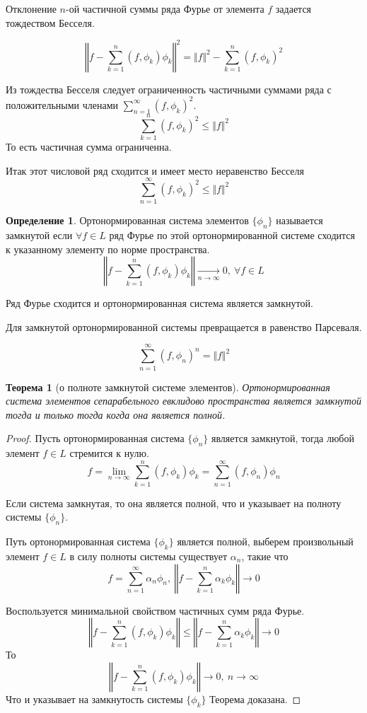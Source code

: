 \documentclass[14pt,a4paper]{extarticle}
\newtheorem{theorem}{Теорема}[section]
\theoremstyle{definition}
\newtheorem{definition}{Определение}[section]
\theoremstyle{remark}
\newcommand{\sep}{ , \ \allowbreak }
\renewcommand{\[}{\begin{dmath*}[compact]}
\renewcommand{\]}{\end{dmath*}}
\begin{document}
Отклонение $n$-ой частичной суммы ряда Фурье от элемента $f$ задается
тождеством Бесселя.

\[\left \Vert f - \sum_{k=1}^n (f,\phi_k) \phi_k \right \Vert ^ 2
= \Vert f \Vert ^ 2 - \sum_{k=1}^n(f,\phi_k)^2 \]

Из тождества Бесселя следует ограниченность частичными
суммами ряда с положительными членами $\sum_{n=1}^\infty (f,\phi_k)^2$.
\[\sum_{k=1}^n (f,\phi_k)^2 \leq \Vert f \Vert ^2 \]
То есть частичная сумма ограниченна.

Итак этот числовой ряд сходится и имеет место неравенство Бесселя
\[\sum_{n=1}^\infty (f,\phi_k)^2 \leq \Vert f \Vert ^2\]

\begin{definition}
  Ортонормированная система элементов $\{\phi_n\}$ называется замкнутой если
  $\forall f \in L$ ряд Фурье по этой ортонормированной системе сходится
  к указанному элементу по норме пространства.
  \[\left \Vert f - \sum_{k=1}^n (f,\phi_k) \phi_k \right \Vert
  \xrightarrow[n \to \infty]{} 0 \sep \forall f\in L\]
\end{definition}

Ряд Фурье сходится и ортонормированная система является замкнутой.

Для замкнутой ортонормированной системы превращается в равенство Пар\-се\-валя.

\[\sum_{n=1}^\infty (f, \phi_n)^n = \Vert f \Vert ^2\]

\begin{theorem}[о полноте замкнутой системе элементов]
  Ортонормированная система элементов сепарабельного евклидово пространства
  является замкнутой тогда и только тогда когда она является полной.
\end{theorem}

\begin{proof}
Пусть ортонормированная система $\{\phi_n\}$ является замкнутой,
тогда любой элемент $f \in L$ стремится к нулю.
\[f = \lim_{n \to \infty} \sum_{k=1}^n (f, \phi_k) \phi_k
= \sum_{n=1}^\infty (f,\phi_n) \phi_n\]

Если система замкнутая, то она является полной,
что и указывает на полноту системы $\{\phi_n\}$.

Путь ортонормированная система $\{\phi_k\}$ является полной,
выберем произвольный элемент $f \in L$ в силу полноты системы
существует $\alpha_n$, такие что
\[f = \sum_{n=1}^\infty \alpha_n \phi_n \sep
\left \Vert f - \sum_{k=1}^n \alpha_k \phi_k \right \Vert \to 0 \]

Воспользуется минимальной свойством частичных сумм ряда Фурье.
\[ \left\Vert f - \sum_{k=1}^n (f,\phi_k) \phi_k \right\Vert
\leq \left\Vert f - \sum_{k=1}^n \alpha_k \phi_k \right\Vert \to 0 \]
То
\[\left\Vert f - \sum_{k=1}^n (f,\phi_k) \phi_k \right\Vert \to 0 \sep
{n \to \infty}\]
Что и указывает на замкнутость системы $\{\phi_k\}$
Теорема доказана.
\end{proof}
\end{document}
